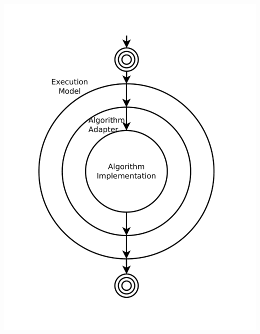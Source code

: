\documentclass[xcolor=dvipsnames]{beamer}
\begin{document}
\begin{frame}
\begin{columns}
\begin{column}{0.35\textwidth}
      \includegraphics[width=1.1\textwidth,trim=2cm 0cm 0cm 0cm,clip]{concentric.pdf}      
    \end{column}
  \end{columns}

\end{frame}

\section{}
\end{document}
